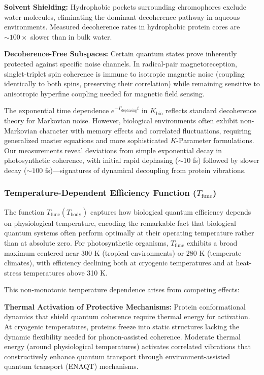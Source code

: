 \documentclass[11pt,a4paper,twoside]{article}
\begin{document}
\textbf{Solvent Shielding:} Hydrophobic pockets surrounding chromophores exclude water molecules, eliminating the dominant decoherence pathway in aqueous environments. Measured decoherence rates in hydrophobic protein cores are $\sim 100\times$ slower than in bulk water.

\textbf{Decoherence-Free Subspaces:} Certain quantum states prove inherently protected against specific noise channels. In radical-pair magnetoreception, singlet-triplet spin coherence is immune to isotropic magnetic noise (coupling identically to both spins, preserving their correlation) while remaining sensitive to anisotropic hyperfine coupling needed for magnetic field sensing.

The exponential time dependence $e^{-\Gamma_{\text{dephasing}} t}$ in $K_{\text{bio}}$ reflects standard decoherence theory for Markovian noise. However, biological environments often exhibit non-Markovian character with memory effects and correlated fluctuations, requiring generalized master equations and more sophisticated $K$-Parameter formulations. Our measurements reveal deviations from simple exponential decay in photosynthetic coherence, with initial rapid dephasing ($\sim 10$ fs) followed by slower decay ($\sim 100$ fs)---signatures of dynamical decoupling from protein vibrations.

\subsubsection{Temperature-Dependent Efficiency Function ($T_{\text{func}}$)}

The function $T_{\text{func}}(T_{\text{body}})$ captures how biological quantum efficiency depends on physiological temperature, encoding the remarkable fact that biological quantum systems often perform optimally at their operating temperature rather than at absolute zero. For photosynthetic organisms, $T_{\text{func}}$ exhibits a broad maximum centered near 300 K (tropical environments) or 280 K (temperate climates), with efficiency declining both at cryogenic temperatures and at heat-stress temperatures above 310 K.

This non-monotonic temperature dependence arises from competing effects:

\textbf{Thermal Activation of Protective Mechanisms:} Protein conformational dynamics that shield quantum coherence require thermal energy for activation. At cryogenic temperatures, proteins freeze into static structures lacking the dynamic flexibility needed for phonon-assisted coherence. Moderate thermal energy (around physiological temperatures) activates correlated vibrations that constructively enhance quantum transport through environment-assisted quantum transport (ENAQT) mechanisms.
\end{document}
